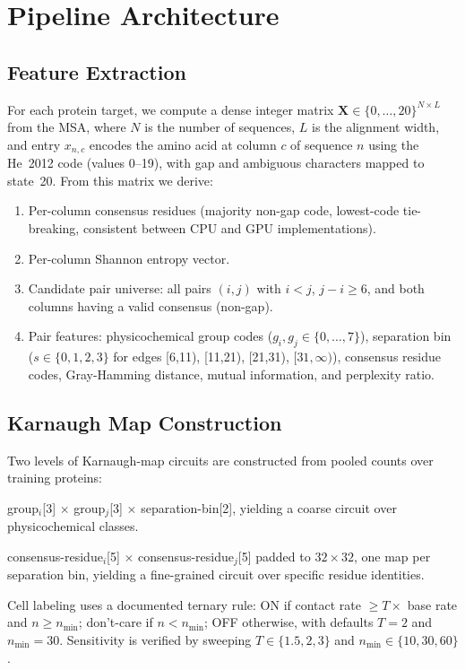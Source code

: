 \section{Pipeline Architecture}
\label{sec:methods-pipeline}

\subsection{Feature Extraction}
For each protein target, we compute a dense integer matrix $\mathbf{X} \in
	\{0, \ldots, 20\}^{N \times L}$ from the MSA, where $N$ is the number of
sequences, $L$ is the alignment width, and entry $x_{n,c}$ encodes the amino
acid at column $c$ of sequence $n$ using the He~2012 code (values 0--19), with
gap and ambiguous characters mapped to state~20.  From this matrix we derive:

\begin{enumerate}[nosep]
	\item Per-column consensus residues (majority non-gap code, lowest-code
	      tie-breaking, consistent between CPU and GPU implementations).
	\item Per-column Shannon entropy vector.
	\item Candidate pair universe: all pairs $(i, j)$ with $i < j$,
	      $j - i \geq 6$, and both columns having a valid consensus (non-gap).
	\item Pair features: physicochemical group codes ($g_i, g_j \in \{0,\ldots,7\}$),
	      separation bin ($s \in \{0,1,2,3\}$ for edges [6,11), [11,21),
	      [21,31), $[31,\infty)$), consensus residue codes, Gray-Hamming
	      distance, mutual information, and perplexity ratio.
\end{enumerate}

\subsection{Karnaugh Map Construction}
Two levels of Karnaugh-map circuits are constructed from pooled counts over
training proteins:
\begin{description}[nosep]
	\item[Level-1 (256 cells):] group$_i$[3] $\times$ group$_j$[3] $\times$
		separation-bin[2], yielding a coarse circuit over physicochemical
		classes.
	\item[Level-2 (4$\times$1024 cells):] consensus-residue$_i$[5] $\times$
		consensus-residue$_j$[5] padded to $32\times32$, one map per
		separation bin, yielding a fine-grained circuit over specific residue
		identities.
\end{description}
Cell labeling uses a documented ternary rule: ON if contact rate $\geq T
	\times$ base rate and $n \geq n_{\min}$; don't-care if $n < n_{\min}$;
OFF otherwise, with defaults $T = 2$ and $n_{\min} = 30$.  Sensitivity is
verified by sweeping $T \in \{1.5, 2, 3\}$ and $n_{\min} \in \{10, 30, 60\}$.

